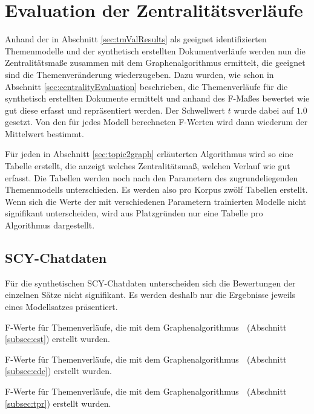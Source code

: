 \section{Evaluation der Zentralitätsverläufe}
\label{sec:centralityResults}

Anhand der in Abschnitt \ref{sec:tmValResults} als geeignet identifizierten Themenmodelle und der synthetisch erstellten Dokumentverläufe werden nun die Zentralitätsmaße zusammen mit dem Graphenalgorithmus ermittelt, die geeignet sind die Themenveränderung wiederzugeben. Dazu wurden, wie schon in Abschnitt \ref{sec:centralityEvaluation} beschrieben, die Themenverläufe für die synthetisch erstellten Dokumente ermittelt und anhand des F-Maßes bewertet wie gut diese erfasst und repräsentiert werden. Der Schwellwert $t$ wurde dabei auf $1.0$ gesetzt. Von den für jedes Modell berechneten F-Werten wird dann wiederum der Mittelwert bestimmt. 

Für jeden in Abschnitt \ref{sec:topic2graph} erläuterten Algorithmus wird so eine Tabelle erstellt, die anzeigt welches Zentralitätsmaß, welchen Verlauf wie gut erfasst. Die Tabellen werden noch nach den Parametern des zugrundeliegenden Themenmodells unterschieden. Es werden also pro Korpus zwölf Tabellen erstellt. Wenn sich die Werte der mit verschiedenen Parametern trainierten Modelle nicht signifikant unterscheiden, wird aus Platzgründen nur eine Tabelle pro Algorithmus dargestellt. 

\subsection{SCY-Chatdaten}

Für die synthetischen SCY-Chatdaten unterscheiden sich die Bewertungen der einzelnen Sätze nicht signifikant. Es werden deshalb nur die Ergebnisse jeweils eines Modellsatzes präsentiert. 
\begin{table}[!ht]
\centering

\caption{F-Werte für Themenverläufe, die mit dem Graphenalgorithmus \CST$\;$ (Abschnitt \ref{subsec:cst}) erstellt wurden.}
\label{tbl:co2CstRuns}
\end{table}
\begin{table}[!ht]
\centering

\caption{F-Werte für Themenverläufe, die mit dem Graphenalgorithmus \CDC$\;$ (Abschnitt \ref{subsec:cdc}) erstellt wurden.}
\label{tbl:co2CdcRuns}
\end{table}
\begin{table}[!ht]
\centering

\caption{F-Werte für Themenverläufe, die mit dem Graphenalgorithmus \TPR$\;$ (Abschnitt \ref{subsec:tpr}) erstellt wurden.}
\label{tbl:co2TprRuns}
\end{table}

